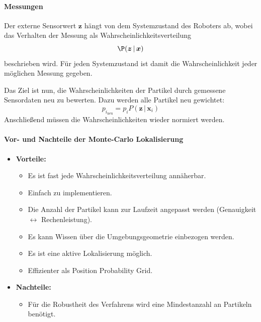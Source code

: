 \documentclass[a4paper, 11pt, accentcolor = tud3b]{tudreport}
\newcommand{\given}{\,\vert\,}
\renewcommand{\vec}[1]{\boldsymbol{#1}}
\begin{document}
					\paragraph{Messungen}
						Der externe Sensorwert \( \vec{z} \) hängt von dem Systemzustand des Roboters ab, wobei das Verhalten der Messung als Wahrscheinlichkeitsverteilung
						\begin{equation*}
							\P(\vec{z} \given \vec{x})
						\end{equation*}
						beschrieben wird. Für jeden Systemzustand ist damit die Wahrscheinlichkeit jeder möglichen Messung gegeben.
						
						Das Ziel ist nun, die Wahrscheinlichkeiten der Partikel durch gemessene Sensordaten neu zu bewerten. Dazu werden alle Partikel neu gewichtet:
						\begin{equation*}
							p_{i_\text{neu}} = p_i P(\vec{z} \given \vec{x}_i)
						\end{equation*}
						Anschließend müssen die Wahrscheinlichkeiten wieder normiert werden.
					
					\paragraph{Vor- und Nachteile der Monte-Carlo Lokalisierung}
						\begin{itemize}
							\item \textbf{Vorteile:}
								\begin{itemize}
									\item Es ist fast jede Wahrscheinlichkeitsverteilung annäherbar.
									\item Einfach zu implementieren.
									\item Die Anzahl der Partikel kann zur Laufzeit angepasst werden (Genauigkeit \(\leftrightarrow\) Rechenleistung).
									\item Es kann Wissen über die Umgebungsgeometrie einbezogen werden.
									\item Es ist eine aktive Lokalisierung möglich.
									\item Effizienter als Position Probability Grid.
								\end{itemize}
							\item \textbf{Nachteile:}
								\begin{itemize}
									\item Für die Robustheit des Verfahrens wird eine Mindestanzahl an Partikeln benötigt.
								\end{itemize}
						\end{itemize}
\end{document}
